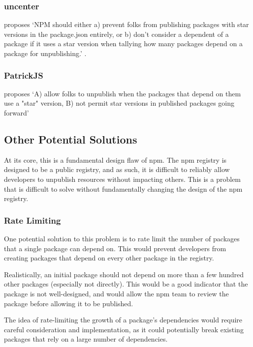 \documentclass[acmsmall]{acmart}
\begin{document}
\subsubsection{uncenter} proposes `NPM should either a) prevent folks from
publishing packages with star versions in the package.json entirely, or b) don't
consider a dependent of a package if it uses a star version when tallying how
many packages depend on a package for unpublishing.'
\cite{uncenter-blog-everything}.

\subsubsection{PatrickJS} proposes `A) allow folks to unpublish when the
packages that depend on them use a "star" version, B) not permit star versions
in published packages going forward' \cite{bleepingcomputer-everything}

\subsection{Other Potential Solutions}
At its core, this is a fundamental design flaw of npm. The npm registry is
designed to be a public registry, and as such, it is difficult to reliably allow
developers to unpublish resources without impacting others. This is a problem
that is difficult to solve without fundamentally changing the design of the npm
registry.

\subsubsection{Rate Limiting}
One potential solution to this problem is to rate limit the number of packages
that a single package can depend on. This would prevent developers from creating
packages that depend on every other package in the registry.

Realistically, an initial package should not depend on more than a few hundred
other packages (especially not directly). This would be a good indicator that
the package is not well-designed, and would allow the npm team to review the
package before allowing it to be published.

The idea of rate-limiting the growth of a package's dependencies would require
careful consideration and implementation, as it could potentially break existing
packages that rely on a large number of dependencies.

\end{document}
